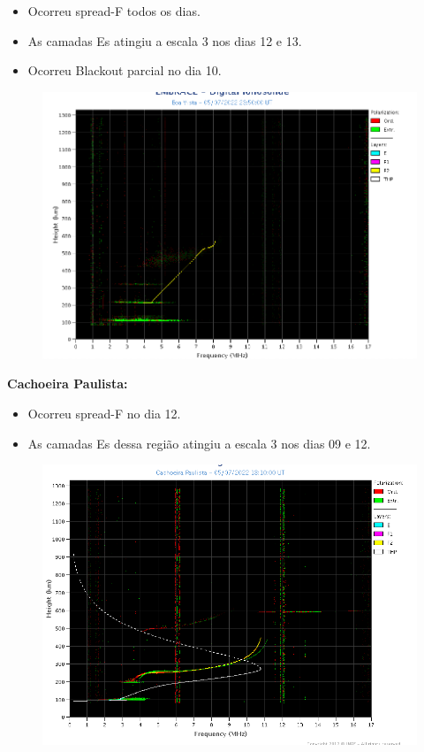 \documentclass[a4paper, 10pt]{article}
\begin{document}
 \begin{itemize}
\item Ocorreu spread-F todos os dias.
\item As camadas Es atingiu a escala 3 nos dias 12 e 13.
\item Ocorreu Blackout parcial no dia 10.
\end{itemize}
\begin{figure}[H]
    \centering
    \includegraphics[width=14cm]{./figures//BoaVista.png}
\end{figure}

\textbf{Cachoeira Paulista:}

 \begin{itemize}
\item Ocorreu spread-F no dia 12.
\item As camadas Es dessa região atingiu a escala 3 nos dias 09 e 12.  
\end{itemize}
\begin{figure}[H]
    \centering
    \includegraphics[width=14cm]{./figures//CachoeiraPaulista.png}
\end{figure}
\end{document}
